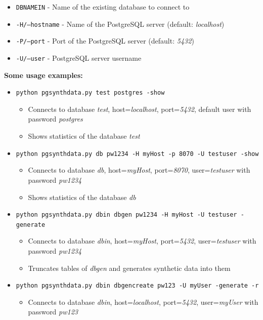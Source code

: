 \begin{itemize}
\item \texttt{DBNAMEIN} - Name of the existing database to connect to
\item \texttt{-H/--hostname} - Name of the PostgreSQL server (default: \textit{localhost})
\item \texttt{-P/--port} - Port of the PostgreSQL server (default: \textit{5432})
\item \texttt{-U/--user} - PostgreSQL server username
\newline
\end{itemize}
\textbf{Some usage examples:}
\begin{itemize}
	\item \texttt{python pgsynthdata.py test postgres -show}
	\begin{itemize}
		\item Connects to database \textit{test}, host=\textit{localhost}, port=\textit{5432}, default user with password \textit{postgres}
		\item Shows statistics of the database \textit{test}
	\end{itemize}
	\item \texttt{python pgsynthdata.py db pw1234 -H myHost -p 8070 -U testuser -show}
	\begin{itemize}
		\item Connects to database \textit{db}, host=\textit{myHost}, port=\textit{8070}, user=\textit{testuser} with password \textit{pw1234}
		\item Shows statistics of the database \textit{db}
	\end{itemize}
	\item \texttt{python pgsynthdata.py dbin dbgen pw1234 -H myHost -U testuser -generate}
	\begin{itemize}
		\item Connects to database \textit{dbin}, host=\textit{myHost}, port=\textit{5432}, user=\textit{testuser} with password \textit{pw1234}
		\item Truncates tables of \textit{dbgen} and generates synthetic data into them
	\end{itemize}
	\item \texttt{python pgsynthdata.py dbin dbgencreate pw123 -U myUser -generate -r}
	\begin{itemize}
		\item Connects to database \textit{dbin}, host=\textit{localhost}, port=\textit{5432}, user=\textit{myUser} with password \textit{pw123}

\end{itemize}
\end{itemize}
